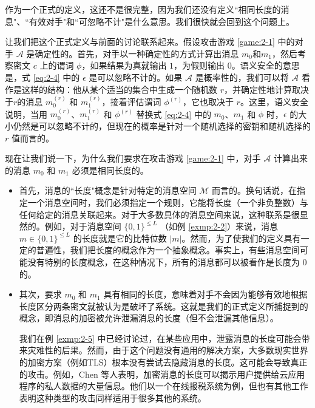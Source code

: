 作为一个正式的定义，这还不是很完整，因为我们还没有定义``相同长度的消息"、``有效对手"和``可忽略不计"是什么意思。我们很快就会回到这个问题上。

让我们把这个正式定义与前面的讨论联系起来。假设攻击游戏 \ref{game:2-1} 中的对手 $\mathcal{A}$ 是确定性的。首先，对手以一种确定性的方式计算出消息 $m_0$和$m_1$，然后考察密文 $c$ 上的谓词 $\phi$，如果结果为真就输出 $1$，为假则输出 $0$。语义安全的意思是，式 \ref{eq:2-4} 中的 $\epsilon$ 是可以忽略不计的。如果 $\mathcal{A}$ 是概率性的，我们可以将 $\mathcal{A}$ 看作是这样的结构：他从某个适当的集合中生成一个随机数 $r$，并确定性地计算取决于$r$的消息 $m^{(r)}_0$ 和 $m^{(r)}_1$，接着评估谓词 $\phi^{(r)}$，它也取决于 $r$。这里，语义安全说明，当用 $m^{(r)}_0$、$m^{(r)}_1$ 和 $\phi^{(r)}$ 替换式 \ref{eq:2-4} 中的 $m_0$、$m_1$ 和 $\phi$ 时，$\epsilon$ 的大小仍然是可以忽略不计的，但现在的概率是针对一个随机选择的密钥和随机选择的 $r$ 值而言的。

\begin{remark}
现在让我们说一下，为什么我们要求在攻击游戏 \ref{game:2-1} 中，对手 $\mathcal{A}$ 计算出来的消息 $m_0$ 和 $m_1$ 必须是相同长度的。
\begin{itemize}
	\item 首先，消息的``长度"概念是针对特定的消息空间 $\mathcal{M}$ 而言的。换句话说，在指定一个消息空间时，我们必须指定一个规则，它能将长度（一个非负整数）与任何给定的消息关联起来。对于大多数具体的消息空间来说，这种联系是很显然的。例如，对于消息空间 $\{0, 1\}^{\leq L}$ （如例 \ref{exmp:2-2}）来说，消息 $m\in\{0, 1\}^{\leq L}$ 的长度就是它的比特位数 $|m|$。然而，为了使我们的定义具有一定的普遍性，我们把长度的概念作为一个抽象概念。事实上，有些消息空间可能没有特别的长度概念，在这种情况下，所有的消息都可以被看作是长度为 $0$ 的。
	\item 其次，要求 $m_0$ 和 $m_1$ 具有相同的长度，意味着对手不会因为能够有效地根据长度区分两条密文就被认为是破坏了系统。这就是我们的正式定义所捕捉到的概念，即消息的加密被允许泄漏消息的长度（但不会泄漏其他信息）。
		
	我们在例 \ref{exmp:2-5} 中已经讨论过，在某些应用中，泄露消息的长度可能会带来灾难性的后果。然而，由于这个问题没有通用的解决方案，大多数现实世界的加密方案（例如TLS）根本没有尝试去隐藏消息的长度。这可能会导致真正的攻击。例如，Chen 等人表明，加密消息的长度可以揭示用户提供给云应用程序的私人数据的大量信息。他们以一个在线报税系统为例，但也有其他工作表明这种类型的攻击同样适用于很多其他的系统。
\end{itemize}
\end{remark}

